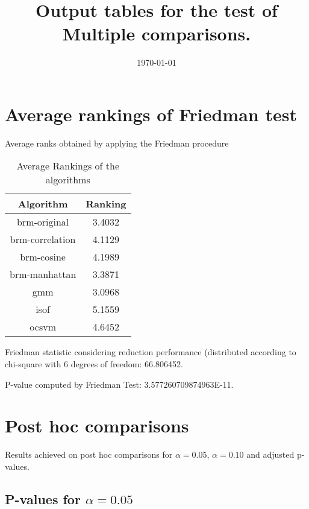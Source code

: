 \documentclass[a4paper,10pt]{article}
\title{Output tables for the test of Multiple comparisons.}
\author{}
\date{\today}
\begin{document}
\begin{landscape}
\pagestyle{empty}
\maketitle
\thispagestyle{empty}
\section{Average rankings of Friedman test}



Average ranks obtained by applying the Friedman procedure

\begin{table}[!htp]
\centering
\begin{tabular}{|c|c|}\hline
Algorithm&Ranking\\\hline
brm-original & 3.4032\\
brm-correlation & 4.1129\\
brm-cosine & 4.1989\\
brm-manhattan & 3.3871\\
gmm & 3.0968\\
isof & 5.1559\\
ocsvm & 4.6452\\
\hline
\end{tabular}
\caption{Average Rankings of the algorithms}
\end{table}

Friedman statistic considering reduction performance (distributed according to chi-square with 6 degrees of freedom: 66.806452.

P-value computed by Friedman Test: 3.577260709874963E-11.\newline



\pagebreak

\section{Post hoc comparisons}

Results achieved on post hoc comparisons for $\alpha = 0.05$, $\alpha = 0.10$ and adjusted p-values.

\subsection{P-values for $\alpha=0.05$}


\end{landscape}
\end{document}
